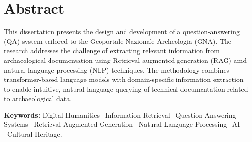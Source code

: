 \chapter{Abstract}
\label{chap:abstract}
\begin{spacing}{1.5}
This dissertation presents the design and development of a question-answering (QA) system tailored to the Geoportale Nazionale Archeologia (GNA). The research addresses the challenge of extracting relevant information from archaeological documentation using Retrieval-augmented generation (RAG) amd natural language processing (NLP) techniques. The methodology combines transformer-based language models with domain-specific information extraction to enable intuitive, natural language querying of technical documentation related to archaeological data.



\vspace{\baselineskip} %
\noindent\textbf{Keywords:} Digital Humanities \textperiodcentered\ Information Retrieval \textperiodcentered\ Question-Answering Systems \textperiodcentered\ Retrieval-Augmented Generation \textperiodcentered\ Natural Language Processing \textperiodcentered\ AI \textperiodcentered\ Cultural Heritage.

\end{spacing}
